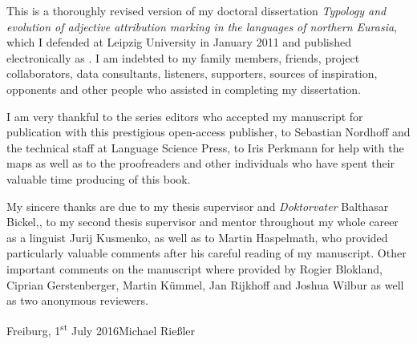 

This is a thoroughly revised version of my doctoral dissertation \textit{Typology and evolution of adjective attribution marking in the languages of northern Eurasia}, which I defended at Leipzig University in January 2011 and published electronically as \citet{riesler2011a}. I am indebted to my family members, friends, project collaborators, data consultants, listeners, supporters, sources of inspiration, opponents and other people who assisted in completing my dissertation. 

I am very thankful to the series editors who accepted my manuscript for publication with this prestigious open-access publisher, to Sebastian Nordhoff and the technical staff at Language Science Press, to Iris Perkmann for help with the maps as well as to the proofreaders and other individuals who have spent their valuable time producing of this book. 

My sincere thanks are due to my thesis supervisor and \emph{Doktorvater} Balthasar Bickel,, to my second thesis supervisor and mentor throughout my whole career as a linguist Jurij Kusmenko, as well as to Martin Haspelmath, who provided particularly valuable comments after his careful reading of my manuscript. Other important comments on the manuscript where provided by Rogier Blokland, Ciprian Gerstenberger, Martin Kümmel, Jan Rijkhoff and Joshua Wilbur as well as two anonymous reviewers.

\bigskip

\noindent
Freiburg, 1\textsuperscript{st} July 2016\hfill Michael Rießler
